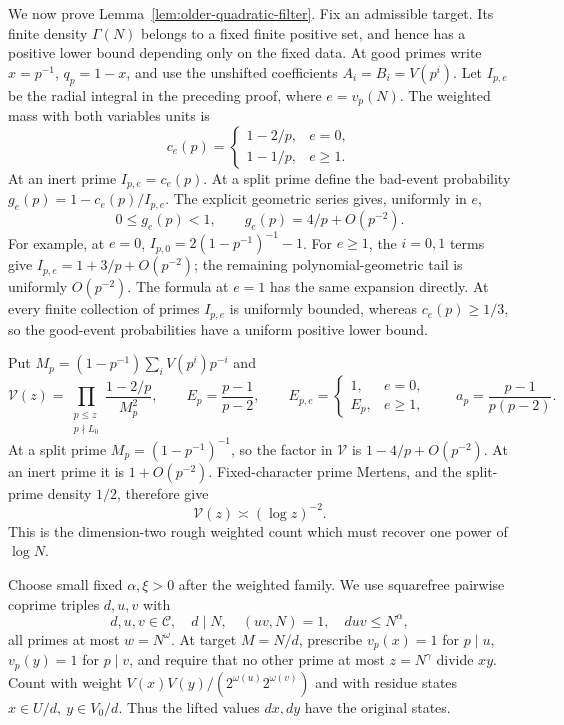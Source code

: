 We now prove Lemma~\ref{lem:older-quadratic-filter}.
Fix an admissible target.  Its finite density \(\Gamma(N)\)
belongs to a fixed finite positive set, and hence has a positive
lower bound depending only on the fixed data.
At good primes write \(x=p^{-1}\), \(q_p=1-x\), and use the
unshifted coefficients \(A_i=B_i=V(p^i)\).
Let \(I_{p,e}\) be the radial integral in the preceding proof,
where \(e=v_p(N)\).
The weighted mass with both variables units is
\[
 c_e(p)=
 \begin{cases}1-2/p,&e=0,\\1-1/p,&e\ge1.\end{cases}
\]
At an inert prime \(I_{p,e}=c_e(p)\).
At a split prime define the bad-event probability
\(g_e(p)=1-c_e(p)/I_{p,e}\).
The explicit geometric series gives, uniformly in \(e\),
\begin{equation}\label{eq:older-roughprob}
             0\le g_e(p)<1,\qquad
             g_e(p)=4/p+O(p^{-2}).
\end{equation}
For example, at \(e=0\),
\(I_{p,0}=2(1-p^{-1})^{-1}-1\).
For \(e\ge1\), the \(i=0,1\) terms give
\(I_{p,e}=1+3/p+O(p^{-2})\); the remaining polynomial-geometric
tail is uniformly \(O(p^{-2})\).
The formula at \(e=1\) has the same expansion directly.
At every finite collection of primes \(I_{p,e}\) is uniformly bounded,
whereas \(c_e(p)\ge1/3\), so the good-event probabilities have a
uniform positive lower bound.

Put \(M_p=(1-p^{-1})\sum_iV(p^i)p^{-i}\) and
\[
 \mathcal V(z)=\prod_{\substack{p\le z\\p\nmid L_0}}
                  \frac{1-2/p}{M_p^2},\qquad
 E_p=\frac{p-1}{p-2},\qquad
 E_{p,e}=\begin{cases}1,&e=0,\\E_p,&e\ge1,\end{cases}
 \qquad a_p=\frac{p-1}{p(p-2)}.
\]
At a split prime \(M_p=(1-p^{-1})^{-1}\), so the factor
in \(\mathcal V\) is \(1-4/p+O(p^{-2})\).
At an inert prime it is \(1+O(p^{-2})\).
Fixed-character prime Mertens, and the split-prime density \(1/2\),
therefore give
\begin{equation}\label{eq:older-roughdimension}
                         \mathcal V(z)\asymp(\log z)^{-2}.
\end{equation}
This is the dimension-two rough weighted count which must recover
one power of \(\log N\).

Choose small fixed \(\alpha,\xi>0\) after the weighted family.
We use squarefree pairwise coprime triples \(d,u,v\) with
\[
 d,u,v\in\mathcal C,\quad d\mid N,\quad (uv,N)=1,\quad
 duv\le N^\alpha,
\]
all primes at most \(w=N^\omega\).
At target \(M=N/d\), prescribe \(v_p(x)=1\) for \(p\mid u\),
\(v_p(y)=1\) for \(p\mid v\), and require that no other prime
at most \(z=N^\gamma\) divide \(xy\).
Count with weight \(V(x)V(y)/(2^{\omega(u)}2^{\omega(v)})\)
and with residue states \(x\in U/d,\ y\in V_0/d\).
Thus the lifted values \(dx,dy\) have the original states.

